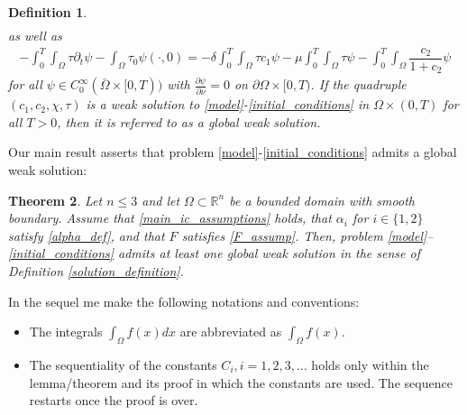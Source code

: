 \documentclass[a4paper,10pt]{article}
\newtheorem{Theorem}{Theorem}[section]
\newtheorem{Definition}[Theorem]{Definition}
\theoremstyle{definition}
\begin{document}
\begin{Definition}
\begin{align}
\end{align}
as well as
\begin{align}
  \label{defeq4}
   - \int_0^T \int_\Omega \tau \partial_t \psi - \int_\Omega \tau_{0} \psi(\cdot, 0) = - \delta \int_0^T \int_\Omega \tau c_{1} \psi - \mu \int_0^T \int_\Omega \tau \psi - \int_0^T \int_\Omega \dfrac{c_{2}}{1 + c_{2}} \psi
\end{align}
for all $\psi \in C^\infty_0(\bar{\Omega} \times [0, T))$ with $\frac{\partial \psi}{\partial \nu} = 0$ on $\partial \Omega \times [0, T)$. If the quadruple $(c_1, c_2, \chi, \tau)$ is a weak solution to \eqref{model}-\eqref{initial_conditions} in $\Omega \times (0, T)$ for all $T > 0$, then it is referred to as a global weak solution.
\end{Definition}

\noindent
Our main result asserts that problem \eqref{model}-\eqref{initial_conditions} admits a global weak solution:

\begin{Theorem}
  \label{main_theorem}
Let $n \leq 3$ and let $\Omega \subset \mathbb{R}^n$ be a bounded domain with smooth boundary. Assume that \eqref{main_ic_assumptions} holds, that $\alpha_i$ for $i \in \{1, 2\}$ satisfy \eqref{alpha_def}, and that $F$ satisfies \eqref{F_assump}. Then, problem \eqref{model}--\eqref{initial_conditions} admits at least one global weak solution in the sense of Definition \ref{solution_definition}.
\end{Theorem}
In the sequel me make the following notations and conventions:
\begin{itemize}
  \item The integrals $\int_\Omega f(x) dx$ are abbreviated as $\int_\Omega f(x) $.
  \item The sequentiality of the constants $C_i, i = 1, 2, 3, \ldots$ holds only within the lemma/theorem and its proof in which the constants are used. The sequence restarts once the proof is over.
 \end{itemize}
 
\end{document}
